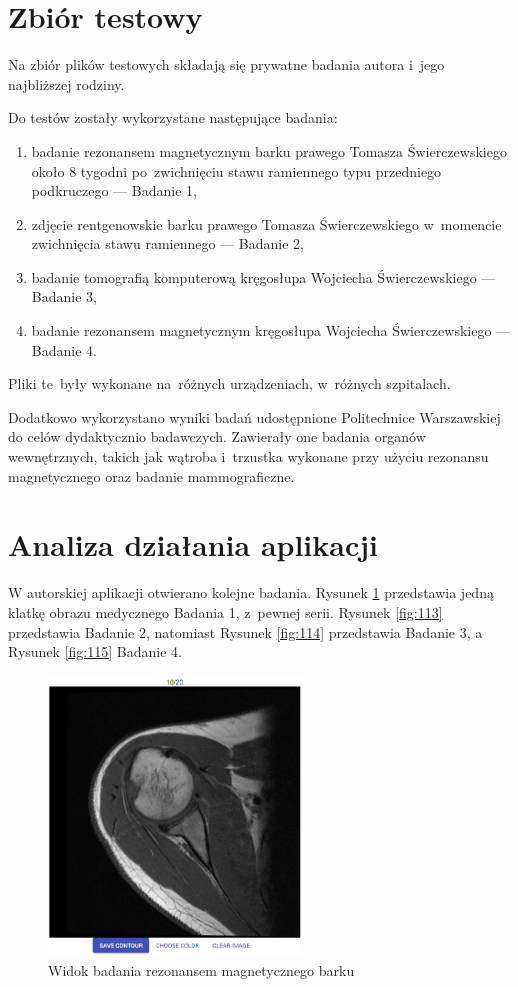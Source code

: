 \documentclass[a4paper,11pt,twoside,openright]{report}
\theoremstyle{definition}
\begin{document}
\section {Zbiór testowy}

Na zbiór plików testowych składają się prywatne badania autora i~jego najbliższej rodziny.

Do testów zostały wykorzystane następujące badania:
\begin{enumerate}[noitemsep]
\item badanie rezonansem magnetycznym barku prawego Tomasza Świerczewskiego około
8 tygodni po~zwichnięciu stawu ramiennego typu przedniego podkruczego --- Badanie 1,
\item zdjęcie rentgenowskie barku prawego Tomasza Świerczewskiego w~momencie zwichnięcia stawu ramiennego --- Badanie 2,
\item badanie tomografią komputerową kręgosłupa Wojciecha Świerczewskiego --- Badanie 3,
\item badanie rezonansem magnetycznym kręgosłupa Wojciecha Świerczewskiego --- Badanie 4.
\end{enumerate}

Pliki te~były wykonane na~różnych urządzeniach, w~różnych szpitalach.

Dodatkowo wykorzystano wyniki badań udostępnione Politechnice Warszawskiej do
celów dydaktycznio badawczych. Zawierały one badania organów wewnętrznych, takich
jak wątroba i~trzustka wykonane przy użyciu rezonansu magnetycznego oraz badanie mammograficzne.

\section {Analiza działania aplikacji}

W autorskiej aplikacji otwierano kolejne badania. Rysunek \ref{fig:112} przedstawia
jedną klatkę obrazu medycznego Badania 1, z~pewnej serii. Rysunek \ref{fig:113}
przedstawia Badanie 2, natomiast Rysunek \ref{fig:114} przedstawia Badanie 3, a
Rysunek \ref{fig:115} Badanie 4.

\begin{figure}[p]
	\center
	\includegraphics[width=0.6\textwidth]{112}
	\caption{Widok badania rezonansem magnetycznego barku}
    	\label{fig:112}
\end{figure}
\end{document}
